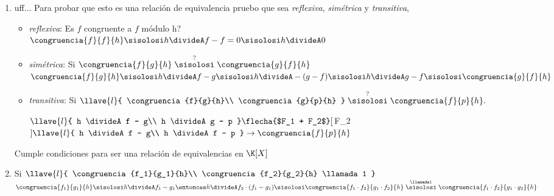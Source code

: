 \begin{enumerate}[label=\roman*)]
	\item uff... \quad
	      Para probar que esto es una relación de equivalencia pruebo que sea
	      \textit{reflexiva},
	      \textit{simétrica} y
	      \textit{transitiva},

	      \begin{itemize}
		      \item \textit{reflexiva}: Es $f$ congruente a $f$ módulo h?\\
		            $\congruencia{f}{f}{h}
			            \sisolosi
			            h \divideA f-f = 0
			            \sisolosi
			            h \divideA 0$ \Tilde

		      \item \textit{simétrica}: Si $\congruencia{f}{g}{h}  \stackrel{?}\sisolosi \congruencia{g}{f}{h}$ \\
		            $\congruencia{f}{g}{h}
			            \sisolosi
			            h \divideA f-g
			            \sisolosi
			            h \divideA -(g-f)
			            \sisolosi
			            h \divideA g-f
			            \sisolosi
			            \congruencia{g}{f}{h}$ \Tilde

		      \item \textit{transitiva}: Si
		            $\llave{l}{
				            \congruencia{f}{g}{h}\\
				            \congruencia{g}{p}{h}
			            }
			            \stackrel{?}\sisolosi
			            \congruencia{f}{p}{h}.\\
		            $

		            $\llave{l}{
				            h \divideA f - g\\
				            h \divideA g - p
			            }
			            \flecha{$F_1 + F_2$}[$\to F_2$]
			            \llave{l}{
				            h \divideA f - g\\
				            h \divideA f - p }
			            \to \congruencia{f}{p}{h} $ \Tilde
	      \end{itemize}
	      Cumple condiciones para ser una relación de equivalencias en $\K[X]$

	\item Si
	      $\llave{l}{
			      \congruencia{f_1}{g_1}{h}\\
			      \congruencia{f_2}{g_2}{h} \llamada1
		      }$\\

	      $\congruencia{f_1}{g_1}{h}
		      \sisolosi
		      h \divideA f_1 - g_1
		      \entonces
		      h \divideA f_2\cdot (f_1 - g_1)
		      \sisolosi
		      \congruencia{f_1\cdot f_2}{g_1\cdot f_2}{h}
		      \stackrel{\llamada1}\sisolosi
		      \congruencia{f_1\cdot f_2}{g_1\cdot g_2}{h}
	      $


\end{enumerate}
